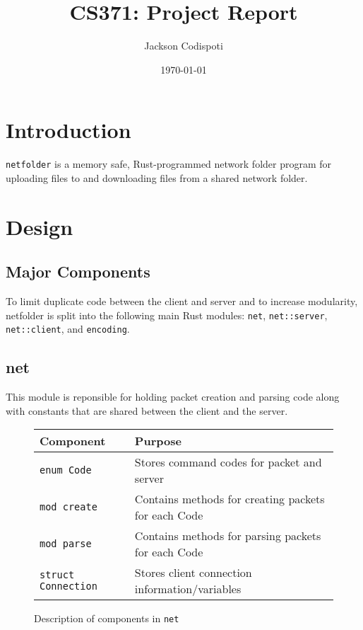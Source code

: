 \documentclass{article}
\title{CS371: Project Report}
\author{Jackson Codispoti}
\date\today
\begin{document}
\maketitle %

\section{Introduction}
\verb|netfolder| is a memory safe, Rust-programmed network folder program for uploading files to and downloading files from a shared network folder.

\section{Design}
\subsection{Major Components}
To limit duplicate code between the client and server and to increase modularity, netfolder is split into the following main Rust modules: \verb|net|, \verb|net::server|, \verb|net::client|, and \verb|encoding|.

\subsection{net}
This module is reponsible for holding packet creation and parsing code along with constants that are shared between the client and the server.
\begin{figure}
	\begin{tabular}{|l|l|}
		\hline
		Component & Purpose\\\hline
		\verb|enum Code| & Stores command codes for packet and server\\
		\verb|mod create| & Contains methods for creating packets for each Code\\
		\verb|mod parse| & Contains methods for parsing packets for each Code\\
		\verb|struct Connection| & Stores client connection information/variables\\ \hline
	\end{tabular}
	\caption{Description of components in \texttt{net}}
\end{figure}
\end{document}
